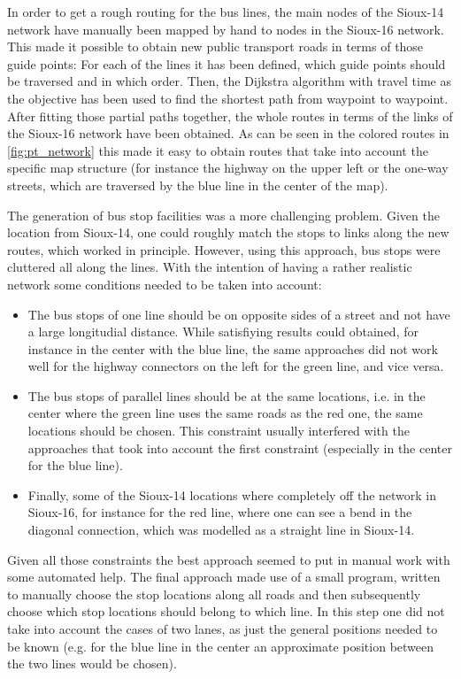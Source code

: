 In order to get a rough routing for the bus lines, the main nodes of the Sioux-14
network have manually been mapped by hand to nodes in the Sioux-16 network. This
made it possible to obtain new public transport roads in terms of those guide points:
For each of the lines it has been defined, which guide points should be traversed
and in which order. Then, the Dijkstra algorithm \citep{Dijkstra} with travel time as the objective
has been used to find the shortest path from waypoint to waypoint. After fitting
those partial paths together, the whole routes in terms of the links of the Sioux-16
network have been obtained. As can be seen in the colored routes in \cref{fig:pt_network}
this made it easy to obtain routes that take into account the specific map structure
(for instance the highway on the upper left or the one-way streets, which are
traversed by the blue line in the center of the map).

The generation of bus stop facilities was a more challenging problem. Given the
location from Sioux-14, one could roughly match the stops to links along the new
routes, which worked in principle. However, using this approach, bus stops were
cluttered all along the lines. With the intention of having a rather realistic
network some conditions needed to be taken into account:

\begin{itemize}
\item The bus stops of one line should be on opposite sides of a street and not
have a large longitudial distance. While satisfiying results could obtained, for
instance in the center with the blue line, the same approaches did not work well
for the highway connectors on the left for the green line, and vice versa.
\item The bus stops of parallel lines should be at the same locations, i.e. in
the center where the green line uses the same roads as the red one, the same
locations should be chosen. This constraint usually interfered with the approaches
that took into account the first constraint (especially in the center for the
blue line).
\item Finally, some of the Sioux-14 locations where completely off the network in Sioux-16,
for instance for the red line, where one can see a bend in the diagonal connection,
which was modelled as a straight line in Sioux-14.
\end{itemize}

Given all those constraints the best approach seemed to put in manual work with
some automated help. The final approach made use of a small program, written to
manually choose the stop locations along all roads and then subsequently choose
which stop locations should belong to which line. In this step one did not take
into account the cases of two lanes, as just the general positions needed to be
known (e.g. for the blue line in the center an approximate position between the
two lines would be chosen).

